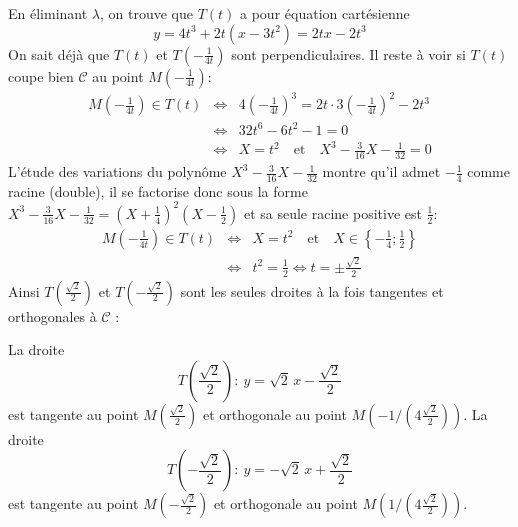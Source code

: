 {{En éliminant $\lambda$, on trouve que $T(t)$ a pour équation cartésienne 
$$y=4t^3+2t(x-3t^2)=2tx-2t^3$$
On sait déjà que $T(t)$ et $T(-\frac{1}{4t})$ sont perpendiculaires. Il reste à voir si $T(t)$ coupe bien $\mathcal{C}$ au point $M(-\frac{1}{4t})$:
\begin{eqnarray*}
M\left(-\frac{1}{4t}\right)\in T(t)&\Longleftrightarrow& 4\left(-\frac{1}{4t}\right)^3=2t\cdot 3\left(-\frac{1}{4t}\right)^2-2t^3\\
 &\Longleftrightarrow& 32t^6-6t^2-1=0\\
 &\Longleftrightarrow& X=t^2\quad\mathrm{et}\quad X^3-\frac{3}{16}X-\frac{1}{32}=0
\end{eqnarray*}
L'étude des variations du polyn\^ome $X^3-\frac{3}{16}X-\frac{1}{32}$ montre qu'il admet $-\frac{1}{4}$ comme racine (double), il se factorise donc sous la forme $X^3-\frac{3}{16}X-\frac{1}{32}=(X+\frac{1}{4})^2(X-\frac{1}{2})$ et sa seule racine positive est $\frac{1}{2}$:
\begin{eqnarray*}
M\left(-\frac{1}{4t}\right)\in T(t)&\Longleftrightarrow& X=t^2\quad\mathrm{et}\quad X\in\left\{-\frac{1}{4};\frac{1}{2}\right\}\\
 &\Longleftrightarrow& t^2=\frac{1}{2}\Longleftrightarrow t=\pm\frac{\sqrt{2}}{2}
\end{eqnarray*}
Ainsi $T(\frac{\sqrt{2}}{2})$ et $T(-\frac{\sqrt{2}}{2})$ sont les seules 
droites à la fois tangentes et orthogonales à $\mathcal{C}$ :

\begin{itemize}
La droite 
$$T(\frac{\sqrt{2}}{2}):\ y=\sqrt{2}\,x-\frac{\sqrt{2}}{2}$$
est tangente au point $M(\frac{\sqrt{2}}{2})$ et orthogonale au point $M(-1/(4\frac{\sqrt{2}}{2}))$.
La droite 
$$T(-\frac{\sqrt{2}}{2}):\ y=-\sqrt{2}\,x+\frac{\sqrt{2}}{2}$$
est tangente au point $M(-\frac{\sqrt{2}}{2})$ et orthogonale au point $M(1/(4\frac{\sqrt{2}}{2}))$.
\end{itemize}
}
}
